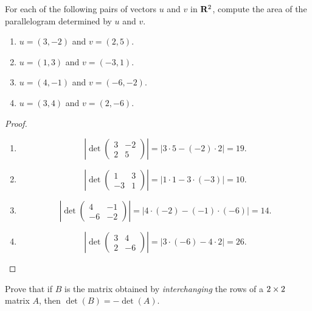 \begin{exercise} \label{exercise 4.1.4}
For each of the following pairs of vectors \(u\) and \(v\) in \(\mathbf{R}^2\), compute the area of the parallelogram determined by \(u\) and \(v\).
\begin{enumerate}
\item \(u = (3, -2)\) and \(v = (2, 5)\).
\item \(u = (1, 3)\) and \(v = (-3, 1)\).
\item \(u = (4, -1)\) and \(v = (-6, -2)\).
\item \(u = (3, 4)\) and \(v = (2, -6)\).
\end{enumerate}
\end{exercise}

\begin{proof} \ 

\begin{enumerate}
\item
\[
    \left| \det \begin{pmatrix} 3 & -2 \\ 2 & 5
\end{pmatrix} \right| = |3 \cdot 5 - (-2) \cdot 2| = 19.
\]

\item
\[
    \left| \det \begin{pmatrix} 1 & 3 \\ -3 & 1
\end{pmatrix} \right| = |1 \cdot 1 - 3 \cdot (-3)| = 10.
\]

\item
\[
    \left| \det \begin{pmatrix} 4 & -1 \\ -6 & -2
\end{pmatrix} \right| = |4 \cdot (-2) - (-1) \cdot (-6)| = 14.
\]

\item
\[
    \left| \det \begin{pmatrix} 3 & 4 \\ 2 & -6
\end{pmatrix} \right| = |3 \cdot (-6) - 4 \cdot 2| = 26.
\]
\end{enumerate}
\end{proof}

\begin{exercise} \label{exercise 4.1.5}
Prove that if \(B\) is the matrix obtained by \emph{interchanging} the rows of a \(2 \times 2\) matrix \(A\), then \(\det(B) = -\det(A)\).
\end{exercise}

